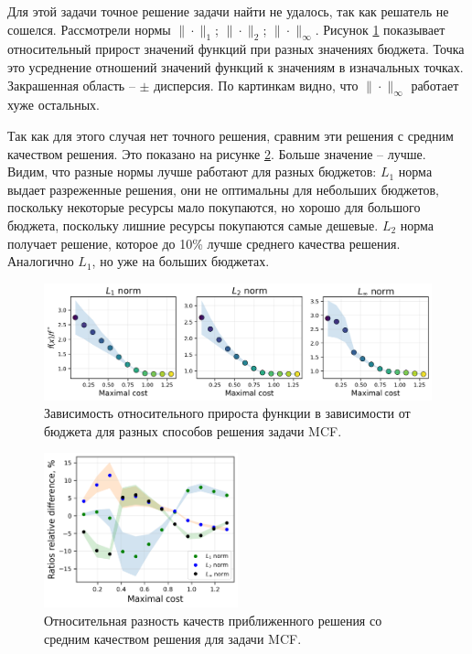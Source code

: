 Для этой задачи точное решение задачи найти не удалось, так как решатель не сошелся. Рассмотрели нормы $\|\cdot\|_1$; $\|\cdot\|_2$; $\|\cdot\|_\infty$. Рисунок \ref{fig:mcf:relations}  показывает относительный прирост значений функций при разных значениях бюджета. Точка это усреднение отношений значений функций к значениям в изначальных точках. Закрашенная область -- $\pm$ дисперсия. По картинкам видно, что $\|\cdot\|_\infty$ работает хуже остальных. 

Так как для этого случая нет точного решения, сравним эти решения с средним качеством решения. Это показано на рисунке \ref{fig:mcf:relative_diff}. Больше значение -- лучше. Видим, что разные нормы лучше работают для разных бюджетов: $L_1$ норма выдает разреженные решения, они не оптимальны для небольших бюджетов, поскольку некоторые ресурсы мало покупаются, но хорошо для большого бюджета, поскольку лишние ресурсы покупаются самые дешевые. $L_2$ норма получает решение, которое до 10\% лучше среднего качества решения. Аналогично $L_1$, но уже на больших бюджетах. 

\begin{figure}
\centering
\includegraphics[width=\textwidth]{figures/mcf/relations.png}
            \caption{ Зависимость относительного прироста функции в зависимости от бюджета для разных способов решения задачи MCF.}
\label{fig:mcf:relations}
\end{figure}
    
\begin{figure}
    \centering
    \includegraphics[width=0.5\textwidth]{figures/mcf/relative_difference.png}
    \caption{ Относительная разность качеств приближенного решения со средним качеством решения для задачи MCF.}
    \label{fig:mcf:relative_diff}
\end{figure}

